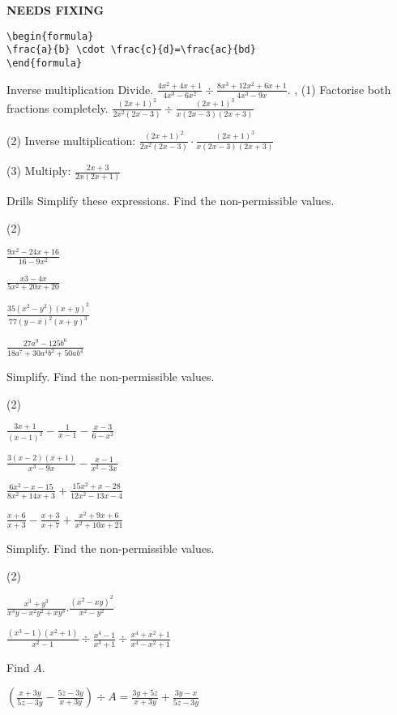 {\hfill\Large\bfseries NEEDS FIXING\hfill}
\begin{lstlisting}
\begin{formula}
\frac{a}{b} \cdot \frac{c}{d}=\frac{ac}{bd}
\end{formula}
 \end{lstlisting} %
\begin{example}{Inverse multiplication}
Divide.
$\frac{4x^{2}+4x+1}{4x^{3}-6x^{2}} \div \frac{8x^{3}+12x^{2}+6x+1}{4x^{3}-9x}$.
\sep
(1) Factorise both fractions completely.
$\frac{(2x+1)^{2}}{2x^{2}(2x-3)} \div \frac{(2x+1)^{3}}{x(2x-3)(2x+3)}$

(2) Inverse multiplication: $\frac{(2x+1)^{2}}{2x^{2}(2x-3)} \cdot \frac{(2x+1)^{3}}{x(2x-3)(2x+3)}$

(3) Multiply: $\frac{2x+3}{2x(2x+1)}$

\end{example}
\begin{questions}{Drills}
Simplify these expressions. Find the non-permissible values.
\begin{question_set}(2)
    \item $\frac{9x^{2}-24x+16}{16-9x^2}$
    \item $\frac{x{3}-4x}{5x^{2}+20x+20}$
    \item $\frac{35\left(x^{2}-y^{2}\right)(x+y)^{2}}{77(y-x)^{2}(x+y)^{3}}$
    \item $\frac{27a^{9}-125b^{6}}{18a^{7}+30a^{4}b^{2}+50ab^{4}}$
\end{question_set}

Simplify. Find the non-permissible values.
\begin{question_set}(2)
    \item $\frac{3x+1}{(x-1)^{2}}-\frac{1}{x-1}-\frac{x-3}{6-x^2}$
    \item $\frac{3(x-2)(x+1)}{x^{3}-9x}-\frac{x-1}{x^{2}-3x}$
    \item $\frac{6x^{2}-x-15}{8x^{2}+14x+3}+\frac{15x^{2}+x-28}{12x^{2}-13x-4}$
    \item $\frac{x+6}{x+3}-\frac{x+3}{x+7}+\frac{x^{2}+9x+6}{x^{2}+10x+21}$
\end{question_set}

Simplify. Find the non-permissible values.
\begin{question_set}(2)
    \item $\frac{x^{3}+y^{3}}{x^{3}y-x^{2}y^{2}+xy^{3}}.\frac{\left(x^{2}-xy\right)^{2}}{x^{2}-y^{2}}$
    \item $\frac{\left(x^{3}-1\right)\left(x^{2}+1\right)}{x^{2}-1} \div \frac{x^{4}-1}{x^{3}+1} \div \frac{x^{4}+x^{2}+1}{x^{4}-x^{2}+1}$ %
\end{question_set}

Find $A$.

$\left(\frac{x+3y}{5z-3y}-\frac{5z-3y}{x+3y}\right) \div A=\frac{3y+5z}{x+3y}+\frac{3y-x}{5z-3y}$
\end{questions}
